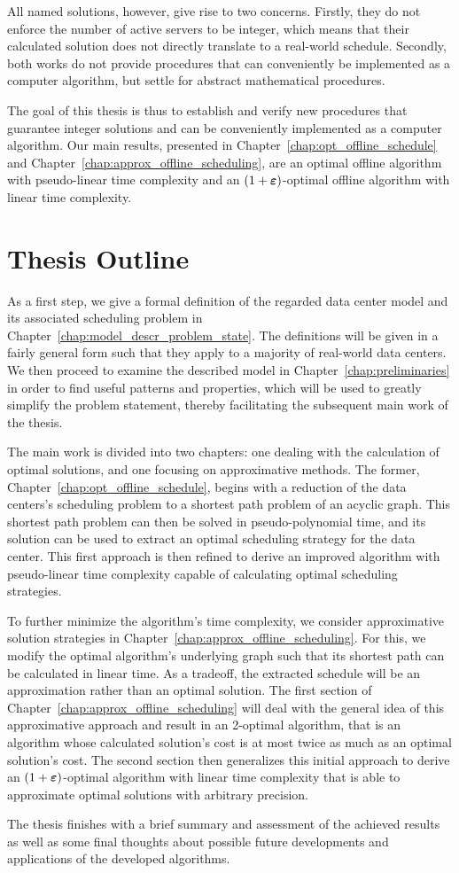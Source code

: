 All named solutions, however, give rise to two concerns. Firstly, they do not enforce the number of active servers to be integer, which means that their calculated solution does not directly translate to a real-world schedule. Secondly, both works do not provide procedures that can conveniently be implemented as a computer algorithm, but settle for abstract mathematical procedures.

The goal of this thesis is thus to establish and verify new procedures that guarantee integer solutions and can be conveniently implemented as a computer algorithm. Our main results, presented in Chapter~\ref{chap:opt_offline_schedule} and Chapter~\ref{chap:approx_offline_scheduling}, are an optimal offline algorithm with pseudo-linear time complexity and an $(1+\boldsymbol\varepsilon)$-optimal offline algorithm with linear time complexity.

\section{Thesis Outline}
As a first step, we give a formal definition of the regarded data center model and its associated scheduling problem in Chapter~\ref{chap:model_descr_problem_state}. The definitions will be given in a fairly general form such that they apply to a majority of real-world data centers. We then proceed to examine the described model in Chapter~\ref{chap:preliminaries} in order to find useful patterns and properties, which will be used to greatly simplify the problem statement, thereby facilitating the subsequent main work of the thesis.

The main work is divided into two chapters: one dealing with the calculation of optimal solutions, and one focusing on approximative methods. The former, Chapter~\ref{chap:opt_offline_schedule}, begins with a reduction of the data centers's scheduling problem to a shortest path problem of an acyclic graph. This shortest path problem can then be solved in pseudo-polynomial time, and its solution can be used to extract an optimal scheduling strategy for the data center. This first approach is then refined to derive an improved algorithm with pseudo-linear time complexity capable of calculating optimal scheduling strategies. 

To further minimize the algorithm's time complexity, we consider approximative solution strategies in Chapter~\ref{chap:approx_offline_scheduling}. For this, we modify the optimal algorithm's underlying graph such that its shortest path can be calculated in linear time. As a tradeoff, the extracted schedule will be an approximation rather than an optimal solution. The first section of Chapter~\ref{chap:approx_offline_scheduling} will deal with the general idea of this approximative approach and result in an 2-optimal algorithm, that is an algorithm whose calculated solution's cost is at most twice as much as an optimal solution's cost. The second section then generalizes this initial approach to derive an $(1+\boldsymbol\varepsilon)$-optimal algorithm with linear time complexity that is able to approximate optimal solutions with arbitrary precision.

The thesis finishes with a brief summary and assessment of the achieved results as well as some final thoughts about possible future developments and applications of the developed algorithms.
